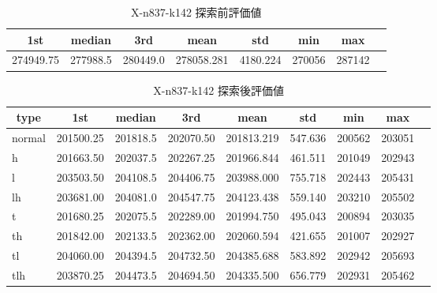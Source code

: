 \begin{table}[htbp]
    \caption{X-n837-k142 探索前評価値}
    \begin{tabular}{|l|l|l|l|l|l|l|l|}\hline
    \multicolumn{1}{|c|}{\textbf{1st}}
    &\multicolumn{1}{c|}{\textbf{median}}
    &\multicolumn{1}{c|}{\textbf{3rd}}
    &\multicolumn{1}{c|}{\textbf{mean}}
    &\multicolumn{1}{c|}{\textbf{std}}
    &\multicolumn{1}{c|}{\textbf{min}}
    &\multicolumn{1}{c|}{\textbf{max}}\\\hline
	274949.75 & 277988.5 & 280449.0 & 278058.281 & 4180.224 & 270056 & 287142\\\hline
	\end{tabular}
\end{table}
\begin{table}[htbp]
    \caption{X-n837-k142 探索後評価値}
    \begin{tabular}{|l|l|l|l|l|l|l|l|l|}\hline
    \multicolumn{1}{|c|}{\textbf{type}}
    &\multicolumn{1}{|c|}{\textbf{1st}}
    &\multicolumn{1}{c|}{\textbf{median}}
    &\multicolumn{1}{c|}{\textbf{3rd}}
    &\multicolumn{1}{c|}{\textbf{mean}}
    &\multicolumn{1}{c|}{\textbf{std}}
    &\multicolumn{1}{c|}{\textbf{min}}
    &\multicolumn{1}{c|}{\textbf{max}}\\\hline
	normal & 201500.25 & 201818.5 & 202070.50 & 201813.219 & 547.636 & 200562 & 203051\\\hline
	h & 201663.50 & 202037.5 & 202267.25 & 201966.844 & 461.511 & 201049 & 202943\\\hline
	l & 203503.50 & 204108.5 & 204406.75 & 203988.000 & 755.718 & 202443 & 205431\\\hline
	lh & 203681.00 & 204081.0 & 204547.75 & 204123.438 & 559.140 & 203210 & 205502\\\hline
	t & 201680.25 & 202075.5 & 202289.00 & 201994.750 & 495.043 & 200894 & 203035\\\hline
	th & 201842.00 & 202133.5 & 202362.00 & 202060.594 & 421.655 & 201007 & 202927\\\hline
	tl & 204060.00 & 204394.5 & 204732.50 & 204385.688 & 583.892 & 202942 & 205693\\\hline
	tlh & 203870.25 & 204473.5 & 204694.50 & 204335.500 & 656.779 & 202931 & 205462\\\hline
	\end{tabular}
\end{table}
